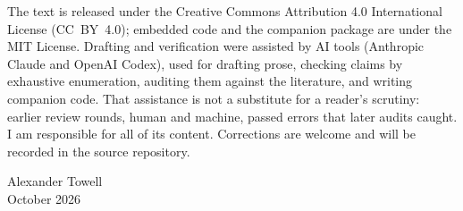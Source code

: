 The text is released under the Creative Commons Attribution 4.0 International
License (CC~BY~4.0); embedded code and the companion package are under the MIT
License. Drafting and verification were assisted by AI tools (Anthropic Claude
and OpenAI Codex), used for drafting prose, checking claims by exhaustive
enumeration, auditing them against the literature, and writing companion code.
That assistance is not a substitute for a reader's scrutiny: earlier review
rounds, human and machine, passed errors that later audits caught. I am responsible
for all of its content. Corrections are welcome
and will be recorded in the source repository.

\bigskip
\noindent Alexander Towell\\
October 2026
